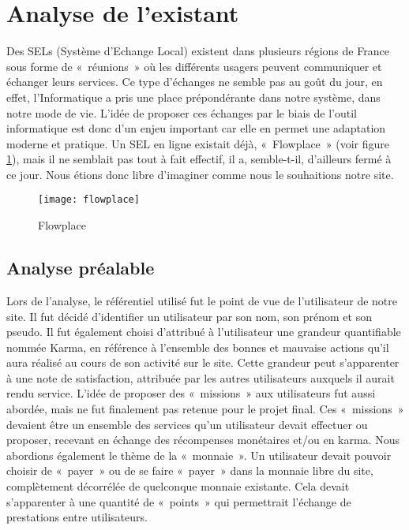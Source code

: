 \section{Analyse de l'existant}

Des SELs (Système d'Echange Local) existent dans plusieurs régions de France sous forme de «~réunions~» où les différents usagers peuvent communiquer et échanger leurs services. 
Ce type d'échanges ne semble pas au goût du jour, en effet, l'Informatique a pris une place prépondérante dans notre système, dans notre mode de vie.
L'idée de proposer ces échanges par le biais de l'outil informatique est donc d'un enjeu important car elle en permet une adaptation moderne et pratique.
Un SEL en ligne existait déjà, «~Flowplace~» (voir figure \ref{fig:flowplace}), mais il ne semblait pas tout à fait effectif, il a, semble-t-il, d'ailleurs fermé à ce jour.
Nous étions donc libre d'imaginer comme nous le souhaitions notre site.

\begin{figure}[ht]
\centering
\texttt{[image: flowplace]}
\caption{Flowplace}
\label{fig:flowplace}
\end{figure}

\subsection{Analyse préalable}

Lors de l'analyse, le référentiel utilisé fut le point de vue de l’utilisateur de notre site. 
Il fut décidé d'identifier un utilisateur par son nom, son prénom et son pseudo.
Il fut également choisi d'attribué à l'utilisateur une grandeur quantifiable nommée Karma, en référence à l’ensemble des bonnes et mauvaise actions qu’il aura réalisé au cours de son activité sur le site. Cette grandeur peut s'apparenter à une note de satisfaction, attribuée par les autres utilisateurs auxquels il aurait rendu service.
L'idée de proposer des «~missions~» aux utilisateurs fut aussi abordée, mais ne fut finalement pas retenue pour le projet final. Ces «~missions~» devaient être un ensemble des services qu'un utilisateur devait effectuer ou proposer, recevant en échange des récompenses monétaires et/ou en karma.
Nous abordions également le thème de la «~monnaie~». Un utilisateur devait pouvoir choisir de «~payer~» ou de se faire «~payer~» dans la monnaie libre du site, complètement décorrélée de quelconque monnaie existante. Cela devait s'apparenter à une quantité de «~points~» qui permettrait l’échange de prestations entre utilisateurs. 

